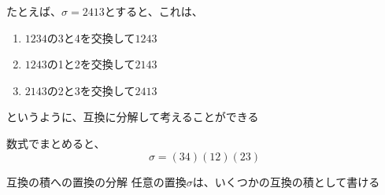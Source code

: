 \documentclass[../../../topic_linear-algebra]{subfiles}
\begin{document}
たとえば、$\sigma = 2413$とすると、これは、
\begin{enumerate}
  \item $1234$の3と4を交換して$1243$
  \item $1243$の1と2を交換して$2143$
  \item $2143$の2と3を交換して$2413$
\end{enumerate}
というように、互換に分解して考えることができる

数式でまとめると、
\begin{equation*}
  \sigma = (34)(12)(23)
\end{equation*}

\begin{theorem*}{互換の積への置換の分解}
  任意の置換$\sigma$は、いくつかの互換の積として書ける
\end{theorem*}
\end{document}
